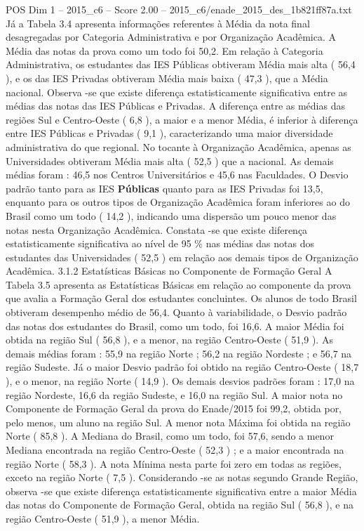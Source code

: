 \begin{textsample}{POS Dim 1 – 2015\_c6 – Score 2.00 – 2015\_c6/enade\_2015\_des\_1b821ff87a.txt}
Já a Tabela 3.4 apresenta informações referentes à Média da nota final desagregadas por Categoria Administrativa e por Organização Acadêmica.
A Média das notas da prova como um todo foi 50,2.
Em relação à Categoria Administrativa, os estudantes das IES Públicas obtiveram Média mais alta ( 56,4 ), e os das IES Privadas obtiveram Média mais baixa ( 47,3 ), que a Média nacional.
Observa -se que existe diferença estatisticamente significativa entre as médias das notas das IES Públicas e Privadas.
A diferença entre as médias das regiões Sul e Centro-Oeste ( 6,8 ), a maior e a menor Média, é inferior à diferença entre IES Públicas e Privadas ( 9,1 ), caracterizando uma maior diversidade administrativa do que regional.
No tocante à Organização Acadêmica, apenas as Universidades obtiveram Média mais alta ( 52,5 ) que a nacional.
As demais médias foram : 46,5 nos Centros Universitários e 45,6 nas Faculdades.
O Desvio padrão tanto para as IES \textbf{Públicas} quanto para as IES Privadas foi 13,5, enquanto para os outros tipos de Organização Acadêmica foram inferiores ao do Brasil como um todo ( 14,2 ), indicando uma dispersão um pouco menor das notas nesta Organização Acadêmica.
Constata -se que existe diferença estatisticamente significativa ao nível de 95 \% nas médias das notas dos estudantes das Universidades ( 52,5 ) em relação aos demais tipos de Organização Acadêmica. 3.1.2 Estatísticas Básicas no Componente de Formação Geral A Tabela 3.5 apresenta as Estatísticas Básicas em relação ao componente da prova que avalia a Formação Geral dos estudantes concluintes.
Os alunos de todo Brasil obtiveram desempenho médio de 56,4.
Quanto à variabilidade, o Desvio padrão das notas dos estudantes do Brasil, como um todo, foi 16,6.
A maior Média foi obtida na região Sul ( 56,8 ), e a menor, na região Centro-Oeste ( 51,9 ).
As demais médias foram : 55,9 na região Norte ; 56,2 na região Nordeste ; e 56,7 na região Sudeste.
Já o maior Desvio padrão foi obtido na região Centro-Oeste ( 18,7 ), e o menor, na região Norte ( 14,9 ).
Os demais desvios padrões foram : 17,0 na região Nordeste, 16,6 da região Sudeste, e 16,0 na região Sul.
A maior nota no Componente de Formação Geral da prova do Enade/2015 foi 99,2, obtida por, pelo menos, um aluno na região Sul.
A menor nota Máxima foi obtida na região Norte ( 85,8 ).
A Mediana do Brasil, como um todo, foi 57,6, sendo a menor Mediana encontrada na região Centro-Oeste ( 52,3 ) ; e a maior encontrada na região Norte ( 58,3 ).
A nota Mínima nesta parte foi zero em todas as regiões, exceto na região Norte ( 7,5 ).
Considerando -se as notas segundo Grande Região, observa -se que existe diferença estatisticamente significativa entre a maior Média das notas do Componente de Formação Geral, obtida na região Sul ( 56,8 ), e na região Centro-Oeste ( 51,9 ), a menor Média.

\end{textsample}
